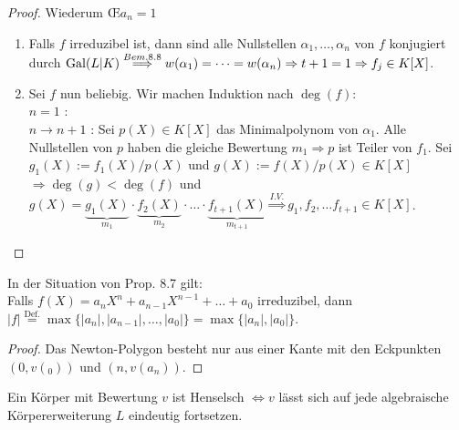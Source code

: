 \begin{proof}
Wiederum \OE $a_n=1$
\begin{enumerate}[(1)]
\item Falls $f$ irreduzibel ist, dann sind alle Nullstellen $\alpha_1, \dots, \alpha_n$ von $f$ konjugiert durch $\operatorname{Gal}(L|K) \stackrel{Bem. 8.8}{\Longrightarrow} w(\alpha_1)=\dots=w(\alpha_n) \Rightarrow t+1=1 \Rightarrow f_j \in K[X]$.
\item Sei $f$ nun beliebig. Wir machen Induktion nach $\deg(f)$:\\
\glqq $n=1$ \grqq: \checkmark\\
\glqq $n \to n+1$ \grqq: Sei $p(X) \in K[X]$ das Minimalpolynom von $\alpha_1$. Alle Nullstellen von $p$ haben die gleiche Bewertung $m_1 \Rightarrow p$ ist Teiler von $f_1$. Sei $g_1(X):= f_1(X)/p(X)$ und $g(X):=f(X)/p(X) \in K[X]$\\
$\Rightarrow \deg(g) < \deg(f)$ und $g(X)=\underbrace{g_1(X)}_{m_1} \cdot \underbrace{f_2(X)}_{m_2} \cdot \ldots \cdot \underbrace{f_{t+1}(X)}_{m_{t+1}} \stackrel{I.V.}{\Rightarrow} g_1, f_2, \dots f_{t+1} \in K[X]$.
\end{enumerate}
\end{proof}

\begin{Kor}
In der Situation von Prop. 8.7 gilt:\\
Falls $f(X)=a_n X^n + a_{n-1}X^{n-1} + \dots + a_0$ irreduzibel, dann $|f| \stackrel{\text{Def.}}{=} \max\{|a_n|, |a_{n-1}|, \dots, |a_0|\}=\max\{|a_n|, |a_0|\}$.
\end{Kor}

\begin{proof}
Das Newton-Polygon besteht nur aus einer Kante mit den Eckpunkten $(0, v(_0))$ und $(n, v(a_n))$.
\end{proof}

\begin{Prop}
Ein Körper mit Bewertung $v$ ist Henselsch $\iff v$ lässt sich auf jede algebraische Körpererweiterung $L$ eindeutig fortsetzen.
\end{Prop}
